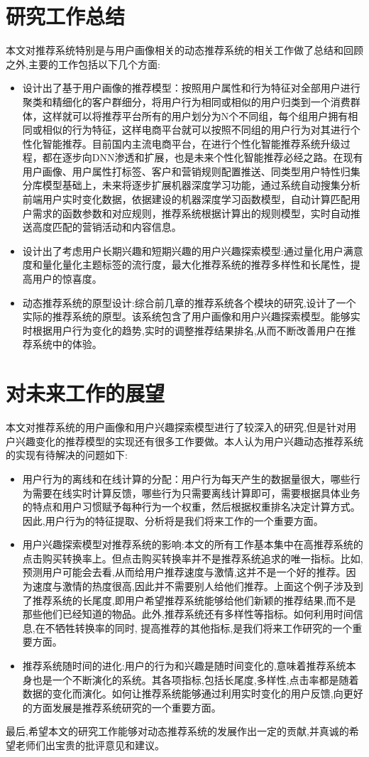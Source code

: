   \section{研究工作总结}
    本文对推荐系统特别是与用户画像相关的动态推荐系统的相关工作做了总结和回顾之外,主要的工作包括以下几个方面:
    \begin{itemize}
      \item 设计出了基于用户画像的推荐模型：按照用户属性和行为特征对全部用户进行聚类和精细化的客户群细分，将用户行为相同或相似的用户归类到一个消费群体，这样就可以将推荐平台所有的用户划分为N个不同组，每个组用户拥有相同或相似的行为特征，这样电商平台就可以按照不同组的用户行为对其进行个性化智能推荐。目前国内主流电商平台，在进行个性化智能推荐系统升级过程，都在逐步向DNN渗透和扩展，也是未来个性化智能推荐必经之路。在现有用户画像、用户属性打标签、客户和营销规则配置推送、同类型用户特性归集分库模型基础上，未来将逐步扩展机器深度学习功能，通过系统自动搜集分析前端用户实时变化数据，依据建设的机器深度学习函数模型，自动计算匹配用户需求的函数参数和对应规则，推荐系统根据计算出的规则模型，实时自动推送高度匹配的营销活动和内容信息。
      \item 设计出了考虑用户长期兴趣和短期兴趣的用户兴趣探索模型:通过量化用户满意度和量化量化主题标签的流行度，最大化推荐系统的推荐多样性和长尾性，提高用户的惊喜度。
      \item 动态推荐系统的原型设计:综合前几章的推荐系统各个模块的研究,设计了一个实际的推荐系统的原型。该系统包含了用户画像和用户兴趣探索模型。能够实时根据用户行为变化的趋势,实时的调整推荐结果排名,从而不断改善用户在推荐系统中的体验。
    \end{itemize}

  \section{对未来工作的展望}
  本文对推荐系统的用户画像和用户兴趣探索模型进行了较深入的研究,但是针对用户兴趣变化的推荐模型的实现还有很多工作要做。本人认为用户兴趣动态推荐系统的实现有待解决的问题如下:
    \begin{itemize}
      \item 用户行为的离线和在线计算的分配：用户行为每天产生的数据量很大，哪些行为需要在线实时计算反馈，哪些行为只需要离线计算即可，需要根据具体业务的特点和用户习惯赋予每种行为一个权重，然后根据权重排名决定计算方式。因此,用户行为的特征提取、分析将是我们将来工作的一个重要方面。
      \item 用户兴趣探索模型对推荐系统的影响:本文的所有工作基本集中在高推荐系统的点击购买转换率上。但点击购买转换率并不是推荐系统追求的唯一指标。比如,预测用户可能会去看,从而给用户推荐速度与激情,这并不是一个好的推荐。因为速度与激情的热度很高,因此并不需要别人给他们推荐。上面这个例子涉及到了推荐系统的长尾度,即用户希望推荐系统能够给他们新颖的推荐结果,而不是那些他们已经知道的物品。此外,推荐系统还有多样性等指标。如何利用时间信息,在不牺牲转换率的同时, 提高推荐的其他指标,是我们将来工作研究的一个重要方面。
      \item 推荐系统随时间的进化:用户的行为和兴趣是随时间变化的,意味着推荐系统本身也是一个不断演化的系统。其各项指标,包括长尾度,多样性,点击率都是随着数据的变化而演化。如何让推荐系统能够通过利用实时变化的用户反馈,向更好的方面发展是推荐系统研究的一个重要方面。
    \end{itemize}

  最后,希望本文的研究工作能够对动态推荐系统的发展作出一定的贡献,并真诚的希望老师们出宝贵的批评意见和建议。